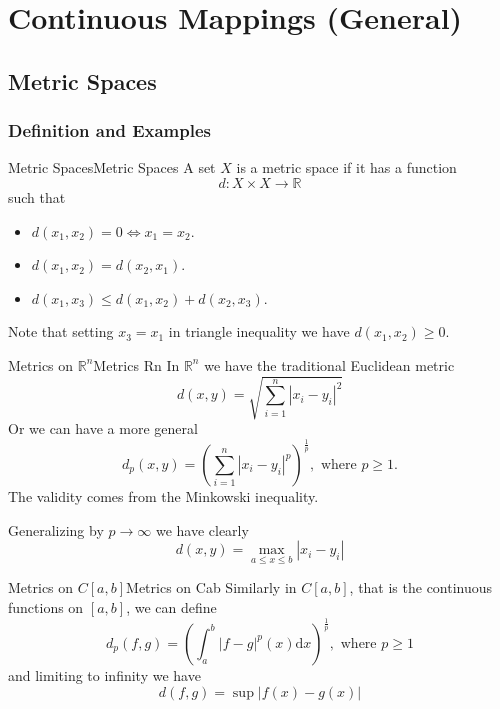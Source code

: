 \documentclass[../main.tex]{subfiles}
\begin{document}
\chapter{Continuous Mappings (General)}

\section{Metric Spaces}
\subsection{Definition and Examples}
\begin{definition}{Metric Spaces}{Metric Spaces}
A set  $X$ is a metric space if it has a function
\begin{equation}
d: X \times X \rightarrow \mathbb{R}
\end{equation}
such that
\begin{itemize}
\item $d(x_1,x_2)=0 \Leftrightarrow x_1=x_2$.
\item $d(x_1,x_2)=d(x_2,x_1)$.
\item $d(x_1,x_3) \leq d(x_1,x_2)+d(x_2,x_3)$.
\end{itemize}
\end{definition}
Note that setting $x_3=x_1$ in triangle inequality we have $d(x_1,x_2) \geq 0$.

\begin{example}{Metrics on $\mathbb{R}^n$}{Metrics Rn}
In $\mathbb{R}^n$ we have the traditional Euclidean metric
\begin{equation}
d(x,y) = \sqrt{\sum_{i=1}^{n} \left|x_i-y_i\right|^2}
\end{equation}
Or we can have a more general
\begin{equation}
d_p(x,y) = \left(\sum_{i=1}^{n} \left|x_i-y_i\right|^p\right)^{\frac{1}{p}}, \text{ where }p \geq 1.
\end{equation}
The validity comes from the Minkowski inequality.

Generalizing by $p \rightarrow \infty $ we have clearly
\begin{equation}
d(x,y) = \max_{a\leq x\leq b} \left|x_i-y_i\right|
\end{equation}
\end{example}

\begin{example}{Metrics on $C[a,b]$}{Metrics on Cab}
Similarly in $C[a,b]$, that is the continuous functions on $[a,b]$, we can define
\begin{equation}
d_p(f,g) = \left(\int_a^b \left|f-g\right|^p(x) \mathrm{d} x\right)^{\frac{1}{p}}, \text{ where }p\geq 1
\end{equation}
and limiting to infinity we have
\begin{equation}
d(f,g) = \sup \left|f(x)-g(x)\right|
\end{equation}
\end{example}
\end{document}
